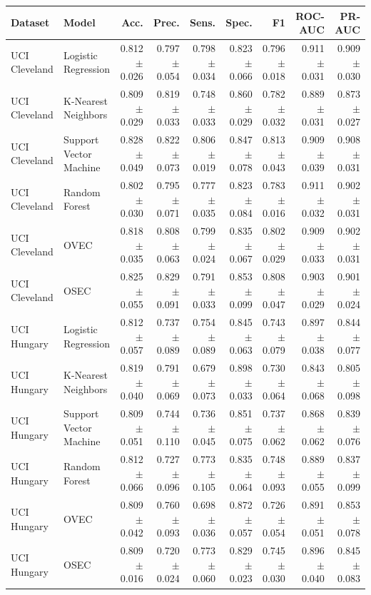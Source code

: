 \begin{tabular}{llrrrrrrr}
\toprule
Dataset & Model & Acc. & Prec. & Sens. & Spec. & F1 & ROC-AUC & PR-AUC \\
\midrule
UCI Cleveland & Logistic Regression & 0.812 $\pm$ 0.026 & 0.797 $\pm$ 0.054 & 0.798 $\pm$ 0.034 & 0.823 $\pm$ 0.066 & 0.796 $\pm$ 0.018 & 0.911 $\pm$ 0.031 & 0.909 $\pm$ 0.030 \\
UCI Cleveland & K-Nearest Neighbors & 0.809 $\pm$ 0.029 & 0.819 $\pm$ 0.033 & 0.748 $\pm$ 0.033 & 0.860 $\pm$ 0.029 & 0.782 $\pm$ 0.032 & 0.889 $\pm$ 0.031 & 0.873 $\pm$ 0.027 \\
UCI Cleveland & Support Vector Machine & 0.828 $\pm$ 0.049 & 0.822 $\pm$ 0.073 & 0.806 $\pm$ 0.019 & 0.847 $\pm$ 0.078 & 0.813 $\pm$ 0.043 & 0.909 $\pm$ 0.039 & 0.908 $\pm$ 0.031 \\
UCI Cleveland & Random Forest & 0.802 $\pm$ 0.030 & 0.795 $\pm$ 0.071 & 0.777 $\pm$ 0.035 & 0.823 $\pm$ 0.084 & 0.783 $\pm$ 0.016 & 0.911 $\pm$ 0.032 & 0.902 $\pm$ 0.031 \\
UCI Cleveland & OVEC & 0.818 $\pm$ 0.035 & 0.808 $\pm$ 0.063 & 0.799 $\pm$ 0.024 & 0.835 $\pm$ 0.067 & 0.802 $\pm$ 0.029 & 0.909 $\pm$ 0.033 & 0.902 $\pm$ 0.031 \\
UCI Cleveland & OSEC & 0.825 $\pm$ 0.055 & 0.829 $\pm$ 0.091 & 0.791 $\pm$ 0.033 & 0.853 $\pm$ 0.099 & 0.808 $\pm$ 0.047 & 0.903 $\pm$ 0.029 & 0.901 $\pm$ 0.024 \\
UCI Hungary & Logistic Regression & 0.812 $\pm$ 0.057 & 0.737 $\pm$ 0.089 & 0.754 $\pm$ 0.089 & 0.845 $\pm$ 0.063 & 0.743 $\pm$ 0.079 & 0.897 $\pm$ 0.038 & 0.844 $\pm$ 0.077 \\
UCI Hungary & K-Nearest Neighbors & 0.819 $\pm$ 0.040 & 0.791 $\pm$ 0.069 & 0.679 $\pm$ 0.073 & 0.898 $\pm$ 0.033 & 0.730 $\pm$ 0.064 & 0.843 $\pm$ 0.068 & 0.805 $\pm$ 0.098 \\
UCI Hungary & Support Vector Machine & 0.809 $\pm$ 0.051 & 0.744 $\pm$ 0.110 & 0.736 $\pm$ 0.045 & 0.851 $\pm$ 0.075 & 0.737 $\pm$ 0.062 & 0.868 $\pm$ 0.062 & 0.839 $\pm$ 0.076 \\
UCI Hungary & Random Forest & 0.812 $\pm$ 0.066 & 0.727 $\pm$ 0.096 & 0.773 $\pm$ 0.105 & 0.835 $\pm$ 0.064 & 0.748 $\pm$ 0.093 & 0.889 $\pm$ 0.055 & 0.837 $\pm$ 0.099 \\
UCI Hungary & OVEC & 0.809 $\pm$ 0.042 & 0.760 $\pm$ 0.093 & 0.698 $\pm$ 0.036 & 0.872 $\pm$ 0.057 & 0.726 $\pm$ 0.054 & 0.891 $\pm$ 0.051 & 0.853 $\pm$ 0.078 \\
UCI Hungary & OSEC & 0.809 $\pm$ 0.016 & 0.720 $\pm$ 0.024 & 0.773 $\pm$ 0.060 & 0.829 $\pm$ 0.023 & 0.745 $\pm$ 0.030 & 0.896 $\pm$ 0.040 & 0.845 $\pm$ 0.083 \\

\end{tabular}
